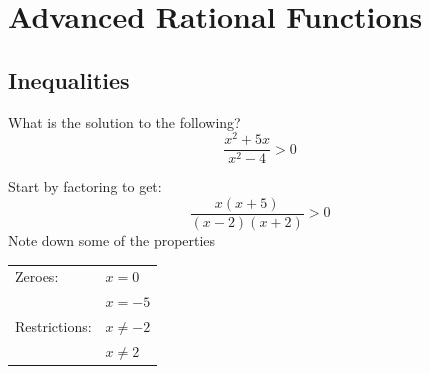 \documentclass{beamer}
\begin{document}
    \section{Advanced Rational Functions}
    \subsection{Inequalities}
    \begin{frame}
        What is the solution to the following?
        $$
            \frac{x^2 + 5x}{x^2 - 4} > 0
        $$
    \end{frame}
    \begin{frame}
        Start by factoring to get:
        $$
            \frac{x(x+5)}{(x-2)(x+2)} > 0
        $$
        Note down some of the properties
        \begin{table}
            \centering
            \begin{tabular}{ll}
                Zeroes: & $x=0$ \\
                & $x=-5$ \\
                Restrictions: & $x\neq-2$ \\
                & $x\neq 2$
            \end{tabular}
        \end{table}
    \end{frame}
\end{document}

